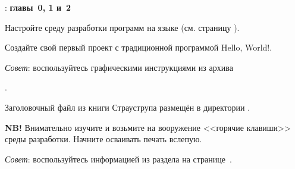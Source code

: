 \WhatToReadSection
\textcite{Stroustrup:2016:ru}: \textbf{главы~0, 1 и~2}



\ExercisesSection
\begin{exercise}
\item Настройте среду разработки программ на языке  (см. страницу \pageref{sect:workEnv}).


\item Создайте свой первый проект с традиционной программой \textenglish{Hello, World!}.

\smallskip
\emph{Совет}: воспользуйтесь графическими инструкциями из архива
\begin{flushleft}
  .
\end{flushleft}

Заголовочный файл  из книги Страуструпа размещён в директории .


\item \textbf{NB!} Внимательно изучите и возьмите на вооружение <<горячие клавиши>> среды разработки. Начните осваивать печать вслепую.

\smallskip
\emph{Совет}: воспользуйтесь информацией из раздела на странице~\pageref{sect:typing}.
\end{exercise}
